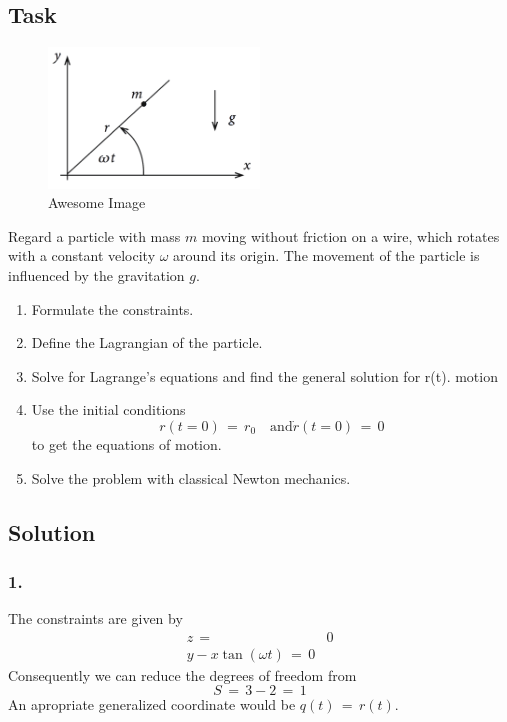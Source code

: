 \subsection{Task}
\begin{figure}[h]
    \centering
    \includegraphics[width=0.5\textwidth]{images/exercises_1_1.png}
    \caption{Awesome Image}
    \label{fig:awesome_image}
\end{figure}
Regard a particle with mass $m$ moving without friction on a wire, which rotates with a
constant velocity $\omega$ around its origin. The movement of the particle is
influenced by the gravitation $g$.
\begin{enumerate}
  \item Formulate the constraints.
  \item Define the Lagrangian of the particle.
  \item Solve for Lagrange's equations and find the general solution for r(t).
motion 
  \item Use the initial conditions
    \begin{equation*}
      r(t=0) \,=\, r_0 \quad \text{and} \dot r(t=0) \,=\, 0
    \end{equation*}
    to get the equations of motion.
  \item Solve the problem with classical Newton mechanics.
\end{enumerate}

\subsection{Solution}
\subsubsection{1.} 
The constraints are given by
\begin{align*}
  z \,=\,& 0 \\
  y - x \tan(\omega t) \,=\, 0
\end{align*}
Consequently we can reduce the degrees of freedom from 
\begin{equation*}
  S \,=\, 3 - 2 \,=\, 1
\end{equation*}
An apropriate generalized coordinate would be $q(t) \,=\, r(t)$.
